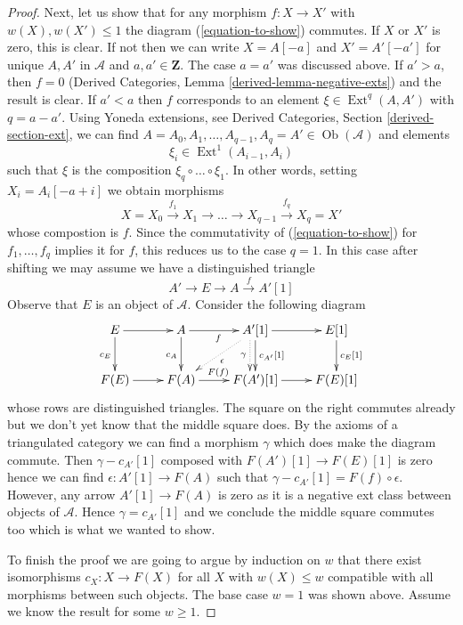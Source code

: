 \documentclass[10pt,a4paper]{amsart}
\theoremstyle{plain}
\theoremstyle{definition}
\theoremstyle{remark}
\numberwithin{equation}{subsection}
\def\Ext{\mathop{\mathrm{Ext}}\nolimits}
\def\Ob{\mathop{\mathrm{Ob}}\nolimits}
\begin{document}
\begin{proof}
\medskip\noindent
Next, let us show that for any morphism $f : X \to X'$  with
$w(X), w(X') \leq 1$ the diagram (\ref{equation-to-show}) commutes.
If $X$ or $X'$ is zero, this is clear. If not then we can write
$X = A[-a]$ and $X' = A'[-a']$ for unique $A, A'$ in $\mathcal{A}$
and $a, a' \in \mathbf{Z}$. The case $a = a'$ was discussed above.
If $a' > a$, then $f = 0$ (Derived Categories, Lemma
\ref{derived-lemma-negative-exts}) and the result is clear.
If $a' < a$ then $f$ corresponds to an element
$\xi \in \Ext^q(A, A')$ with $q = a - a'$. Using Yoneda extensions, see
Derived Categories, Section \ref{derived-section-ext}, we can find
$A = A_0, A_1, \ldots, A_{q - 1}, A_q = A' \in \Ob(\mathcal{A})$ and
elements
$$
\xi_i \in \Ext^1(A_{i - 1}, A_i)
$$
such that $\xi$ is the composition $\xi_q \circ \ldots \circ \xi_1$.
In other words, setting $X_i = A_i[-a + i]$
we obtain morphisms
$$
X = X_0 \xrightarrow{f_1} X_1 \to \ldots \to X_{q - 1}
\xrightarrow{f_q} X_q = X'
$$
whose compostion is $f$. Since the commutativity of  (\ref{equation-to-show})
for $f_1, \ldots, f_q$ implies it for $f$, this reduces us to the case $q = 1$.
In this case after shifting we may assume we have a distinguished triangle
$$
A' \to E \to A \xrightarrow{f} A'[1]
$$
Observe that $E$ is an object of $\mathcal{A}$. Consider the following
diagram
$$
\xymatrix{
E \ar[d]_{c_E} \ar[r] &
A \ar[d]_{c_A} \ar[r]_f &
A'[1] \ar[d]^{c_{A'}[1]}
\ar@{..>}@<-1ex>[d]_\gamma \ar@{..>}[ld]^\epsilon \ar[r] &
E[1] \ar[d]^{c_E[1]} \\
F(E) \ar[r] &
F(A) \ar[r]^{F(f)} &
F(A')[1] \ar[r] &
F(E)[1]
}
$$
whose rows are distinguished triangles.
The square on the right commutes already but we don't yet know that
the middle square does. By the axioms of a triangulated category
we can find a morphism $\gamma$ which does make the diagram commute.
Then $\gamma - c_{A'}[1]$ composed with
$F(A')[1] \to F(E)[1]$ is zero hence we
can find $\epsilon : A'[1] \to F(A)$ such that
$\gamma - c_{A'}[1] = F(f) \circ \epsilon$. However, any arrow
$A'[1] \to F(A)$ is zero as it is a negative ext class
between objects of $\mathcal{A}$. Hence $\gamma = c_{A'}[1]$
and we conclude the middle square commutes too which is what we
wanted to show.

\medskip\noindent
To finish the proof we are going to argue by induction on $w$
that there exist isomorphisms $c_X : X \to F(X)$ for all
$X$ with $w(X) \leq w$ compatible with all morphisms between
such objects. The base case $w = 1$ was shown above. Assume
we know the result for some $w \geq 1$.


\end{proof}
\end{document}
